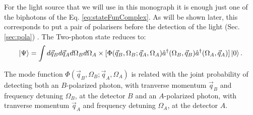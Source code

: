 For the light source that we will use in this monograph it is enough just one of the biphotons of the Eq. \ref{eq:stateFunComplex}. 
As will be shown later, this corresponds to put a pair of polarisers before the detection of the light (Sec. \ref{sec:pola})
. The Two-photon state reduces to:
\begin{equation}
\label{eq:stateFun}
\ket{\Psi}=\int d\vec{q}_B d\vec{q}_A d\Omega_B d\Omega_A 
\times [\Phi(\vec{q}_B,\Omega_B;\vec{q}_A,\Omega_A) \hat{a}^{\dagger} (\Omega_B,\vec{q}_B) \hat{a}^{\dagger}(\Omega_A,\vec{q}_A) 
] \ket{0}.  
\end{equation}

The mode function  $\Phi(\vec{q}_B,\Omega_B;\vec{q}_A,\Omega_A)$ is related with the joint probability of detecting both an $B$-polarized
photon, with tranverse momentum $\vec{q}_B$ and frequency detuning $\Omega_B$, at the detector $B$ 
and an $A$-polarized
photon, with tranverse momentum $\vec{q}_A$ and frequency detuning $\Omega_A$, at the detector $A$. 

